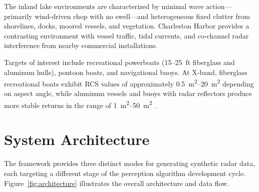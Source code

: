 \documentclass[conf]{new-aiaa}
\begin{document}
The inland lake environments are characterized by minimal wave action---primarily wind-driven chop with no swell---and heterogeneous fixed clutter from shorelines, docks, moored vessels, and vegetation. Charleston Harbor provides a contrasting environment with vessel traffic, tidal currents, and co-channel radar interference from nearby commercial installations.

Targets of interest include recreational powerboats (15--25~ft fiberglass and aluminum hulls), pontoon boats, and navigational buoys. At X-band, fiberglass recreational boats exhibit RCS values of approximately \SIrange{0.5}{20}{\meter\squared} depending on aspect angle, while aluminum vessels and buoys with radar reflectors produce more stable returns in the range of \SIrange{1}{50}{\meter\squared}~\cite{knott2004radar, skolnik2001introduction}.

\section{System Architecture}
\label{sec:architecture}

The framework provides three distinct modes for generating synthetic radar data, each targeting a different stage of the perception algorithm development cycle. Figure~\ref{fig:architecture} illustrates the overall architecture and data flow.
\end{document}
